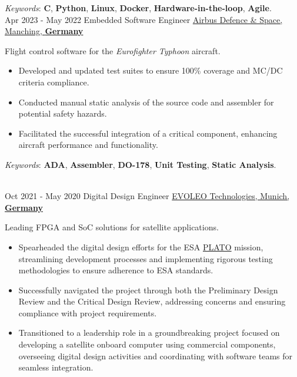 \documentclass[letterpaper]{twentysecondcv} %
\begin{document}
\begin{twenty}
{            \vspace{1 mm}
            \textit{Keywords}: \textbf{C}, \textbf{Python}, \textbf{Linux}, \textbf{Docker}, \textbf{Hardware-in-the-loop}, \textbf{Agile}.
        }\\
    \twentyitem
        {Apr 2023 -}
        {May 2022}
        {Embedded Software Engineer}
        {\href{https://www.airbus.com/en/who-we-are}{Airbus Defence \& Space, Manching, \textbf{Germany}}}
        {}
        {
            Flight control software for the \textit{Eurofighter Typhoon} aircraft.
            \vspace{1 mm}
            \begin{itemize}
                \item Developed and updated test suites to ensure 100\% coverage and MC/DC criteria compliance.
                \item Conducted manual static analysis of the source code and assembler for potential safety hazards.
                \item Facilitated the successful integration of a critical component, enhancing aircraft performance and functionality.
            \end{itemize}

            \vspace{1 mm}
            \textit{Keywords}: \textbf{ADA}, \textbf{Assembler}, \textbf{DO-178}, \textbf{Unit Testing}, \textbf{Static Analysis}.
        }\\
    \twentyitem
        {Oct 2021 -}
    	{May 2020}
        {Digital Design Engineer}
        {\href{http://evoleotech.com/company/}{EVOLEO Technologies, Munich, \textbf{Germany}}}
        {}
        {
            Leading FPGA and SoC solutions for satellite applications.
            \vspace{1 mm}
            \begin{itemize}
                \item Spearheaded the digital design efforts for the ESA \href{https://sci.esa.int/web/plato}{PLATO} mission, streamlining development processes and implementing rigorous testing methodologies to ensure adherence to ESA standards.
                \item Successfully navigated the project through both the Preliminary Design Review and the Critical Design Review, addressing concerns and ensuring compliance with project requirements.
                \item Transitioned to a leadership role in a groundbreaking project focused on developing a satellite onboard computer using commercial components, overseeing digital design activities and coordinating with software teams for seamless integration.
            \end{itemize}

}
\end{twenty}
\end{document}
